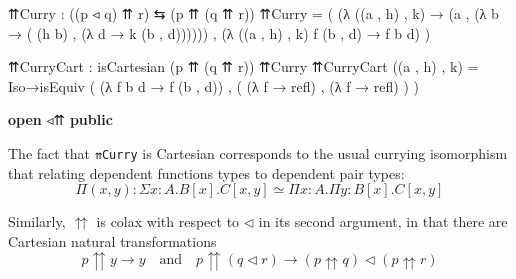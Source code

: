 \documentclass[
  11pt,
  oneside,
  article]{memoir}
\newenvironment{Shaded}{}{}
\newcommand{\KeywordTok}[1]{\textcolor[rgb]{0.00,0.44,0.13}{\textbf{#1}}}
\newcommand{\NormalTok}[1]{#1}
\newcommand{\OtherTok}[1]{\textcolor[rgb]{0.00,0.44,0.13}{#1}}
\theoremstyle{definition}
\theoremstyle{plain}
\newcommand{\0}{\textsf{0}}
\newcommand{\1}{\tn{\textsf{1}}}
\begin{document}
\begin{Shaded}
\begin{Highlighting}[]
\NormalTok{    ⇈Curry }\OtherTok{:} \OtherTok{((}\NormalTok{p ◃ q}\OtherTok{)}\NormalTok{ ⇈ r}\OtherTok{)}\NormalTok{ ⇆ }\OtherTok{(}\NormalTok{p ⇈ }\OtherTok{(}\NormalTok{q ⇈ r}\OtherTok{))}
\NormalTok{    ⇈Curry }\OtherTok{=} \OtherTok{(} \OtherTok{(λ} \OtherTok{((}\NormalTok{a , h}\OtherTok{)}\NormalTok{ , k}\OtherTok{)} 
                  \OtherTok{→} \OtherTok{(}\NormalTok{a , }\OtherTok{(λ}\NormalTok{ b }\OtherTok{→} \OtherTok{(} \OtherTok{(}\NormalTok{h b}\OtherTok{)} 
\NormalTok{                                , }\OtherTok{(λ}\NormalTok{ d }\OtherTok{→}\NormalTok{ k }\OtherTok{(}\NormalTok{b , d}\OtherTok{))))))}
\NormalTok{             , }\OtherTok{(λ} \OtherTok{((}\NormalTok{a , h}\OtherTok{)}\NormalTok{ , k}\OtherTok{)}\NormalTok{ f }\OtherTok{(}\NormalTok{b , d}\OtherTok{)} \OtherTok{→}\NormalTok{ f b d}\OtherTok{)} \OtherTok{)}
    
\NormalTok{    ⇈CurryCart }\OtherTok{:}\NormalTok{ isCartesian }\OtherTok{(}\NormalTok{p ⇈ }\OtherTok{(}\NormalTok{q ⇈ r}\OtherTok{))}\NormalTok{ ⇈Curry}
\NormalTok{    ⇈CurryCart }\OtherTok{((}\NormalTok{a , h}\OtherTok{)}\NormalTok{ , k}\OtherTok{)} \OtherTok{=} 
\NormalTok{        Iso→isEquiv }\OtherTok{(} \OtherTok{(λ}\NormalTok{ f b d }\OtherTok{→}\NormalTok{ f }\OtherTok{(}\NormalTok{b , d}\OtherTok{))} 
\NormalTok{                    , }\OtherTok{(} \OtherTok{(λ}\NormalTok{ f }\OtherTok{→}\NormalTok{ refl}\OtherTok{)}
\NormalTok{                      , }\OtherTok{(λ}\NormalTok{ f }\OtherTok{→}\NormalTok{ refl}\OtherTok{)} \OtherTok{)} \OtherTok{)}

\KeywordTok{open}\NormalTok{ ◃⇈ }\KeywordTok{public}
\end{Highlighting}
\end{Shaded}

The fact that \texttt{⇈Curry} is Cartesian corresponds to the usual
currying isomorphism that relating dependent functions types to
dependent pair types: \[
\Pi (x , y) : \Sigma x : A . B[x] . C[x,y] \simeq \Pi x : A . \Pi y : B[x] . C[x,y]
\]

Similarly, \(\upuparrows\) is colax with respect to \(\triangleleft\) in
its second argument, in that there are Cartesian natural transformations
\[
p \upuparrows y \to y \quad \text{and} \quad
p \upuparrows (q \triangleleft r) \to (p \upuparrows q) \triangleleft (p \upuparrows r)
\]
\end{document}
